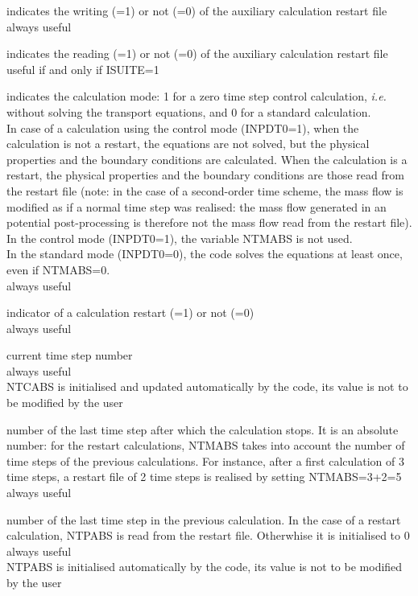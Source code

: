 {indicates the writing (=1) or not (=0) of the auxiliary calculation
restart file\\   
always useful}

{indicates the reading (=1) or not (=0) of the auxiliary
calculation restart file\\
useful if and only if ISUITE=1}

{indicates the calculation mode: 1 for a zero time step control
calculation, {\em i.e.} without solving the transport equations,
and 0 for a standard calculation.\\
In case of a calculation using the control mode (INPDT0=1), when the
calculation is not a restart, the equations are not solved, but the
physical properties and the boundary conditions are calculated. When
the calculation is a restart, the physical properties and the boundary
conditions are those read from the restart file (note: in the case of a
second-order time scheme, the mass flow is modified as if a normal
time step was realised: the mass flow generated in an potential
post-processing is therefore not the mass flow read from the restart file).\\
In the control mode (INPDT0=1), the variable NTMABS is not used.\\
In the standard mode (INPDT0=0), the code solves the equations at least
once, even if NTMABS=0.\\
always useful}

{indicator of a calculation restart (=1) or not (=0)\\
always useful}

{current time step number\\
always useful\\
NTCABS is initialised and updated automatically by the code, its value is not to
be modified by the user}

{number of the last time step after which the calculation stops. It is
an absolute number: for the restart calculations, NTMABS takes into
account the number of time steps of the previous calculations. For
instance, after a first calculation of 3 time steps, a restart file of 2
time steps is realised by setting NTMABS=3+2=5\\
always useful}

{number of the last time step in the previous calculation. In the case of
a restart calculation, NTPABS is read from the restart file. Otherwhise
it is initialised to 0\\
always useful\\
NTPABS is initialised automatically by the code, its value is not to
be modified by the user}

